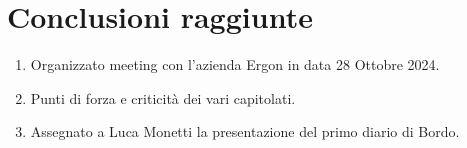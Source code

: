 \documentclass{TWReport}
\begin{document}
\section*{Conclusioni raggiunte}
\begin{enumerate}
    \item Organizzato meeting con l'azienda Ergon in data 28 Ottobre 2024.
    \item Punti di forza e criticità dei vari capitolati.
    \item Assegnato a Luca Monetti la presentazione del primo diario di Bordo.
\end{enumerate}


\tasklist
\end{document}
